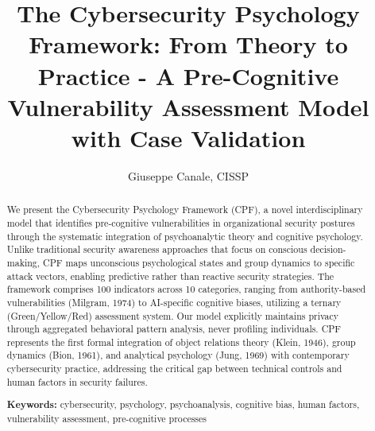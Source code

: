 \documentclass[manuscript,screen,review]{acmart}
\begin{document}
\title{The Cybersecurity Psychology Framework: From Theory to Practice - A Pre-Cognitive Vulnerability Assessment Model with Case Validation}

\author{Giuseppe Canale, CISSP}

\renewcommand{\shortauthors}{Canale}

\begin{abstract}
\noindent
We present the Cybersecurity Psychology Framework (CPF), a novel interdisciplinary model that identifies pre-cognitive vulnerabilities in organizational security postures through the systematic integration of psychoanalytic theory and cognitive psychology. Unlike traditional security awareness approaches that focus on conscious decision-making, CPF maps unconscious psychological states and group dynamics to specific attack vectors, enabling predictive rather than reactive security strategies. The framework comprises 100 indicators across 10 categories, ranging from authority-based vulnerabilities (Milgram, 1974) to AI-specific cognitive biases, utilizing a ternary (Green/Yellow/Red) assessment system. Our model explicitly maintains privacy through aggregated behavioral pattern analysis, never profiling individuals. CPF represents the first formal integration of object relations theory (Klein, 1946), group dynamics (Bion, 1961), and analytical psychology (Jung, 1969) with contemporary cybersecurity practice, addressing the critical gap between technical controls and human factors in security failures.

\vspace{0.5em}
\noindent\textbf{Keywords:} cybersecurity, psychology, psychoanalysis, cognitive bias, human factors, vulnerability assessment, pre-cognitive processes
\end{abstract}
\end{document}
